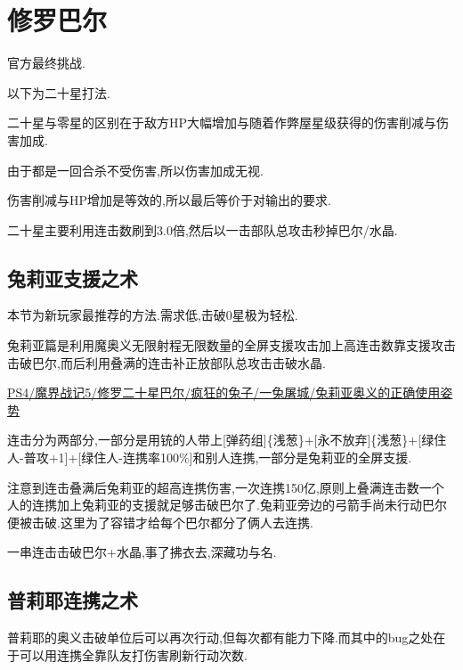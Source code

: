 \newpage

\section{修罗巴尔}

官方最终挑战.

{\color{red}{如果准备了大概200个万灵药做的咖喱可以不需要装备就达到20亿血,简化辅助人员的需求}}

	\newpage
	
	以下为二十星打法.

	二十星与零星的区别在于敌方HP大幅增加与随着作弊屋星级获得的伤害削减与伤害加成.

	由于都是一回合杀不受伤害,所以伤害加成无视.

	伤害削减与HP增加是等效的,所以最后等价于对输出的要求.

	二十星主要利用连击数刷到3.0倍,然后以一击部队总攻击秒掉巴尔/水晶.


	\newpage

	\subsection{兔莉亚支援之术}

	本节为新玩家最推荐的方法.需求低,击破0星极为轻松.

	兔莉亚篇是利用魔奥义无限射程无限数量的全屏支援攻击加上高连击数靠支援攻击击破巴尔,而后利用叠满的连击补正放部队总攻击击破水晶.

	\href{http://www.bilibili.com/video/av2989748/}{PS4/魔界战记5/修罗二十星巴尔/疯狂的兔子/一兔屠城/兔莉亚奥义的正确使用姿势}


	连击分为两部分,一部分是用铳的人带上[弹药组]\{浅葱\}+[永不放弃]\{浅葱\}+[绿住人-普攻+1]+[绿住人-连携率100\%]和别人连携,一部分是兔莉亚的全屏支援.

	注意到连击叠满后兔莉亚的超高连携伤害,一次连携150亿,原则上叠满连击数一个人的连携加上兔莉亚的支援就足够击破巴尔了.兔莉亚旁边的弓箭手尚未行动巴尔便被击破.这里为了容错才给每个巴尔都分了俩人去连携.

	一串连击击破巴尔+水晶,事了拂衣去,深藏功与名.

	\newpage

	\subsection{普莉耶连携之术}

	普莉耶的奥义击破单位后可以再次行动,但每次都有能力下降.而其中的bug之处在于可以用连携全靠队友打伤害刷新行动次数.

